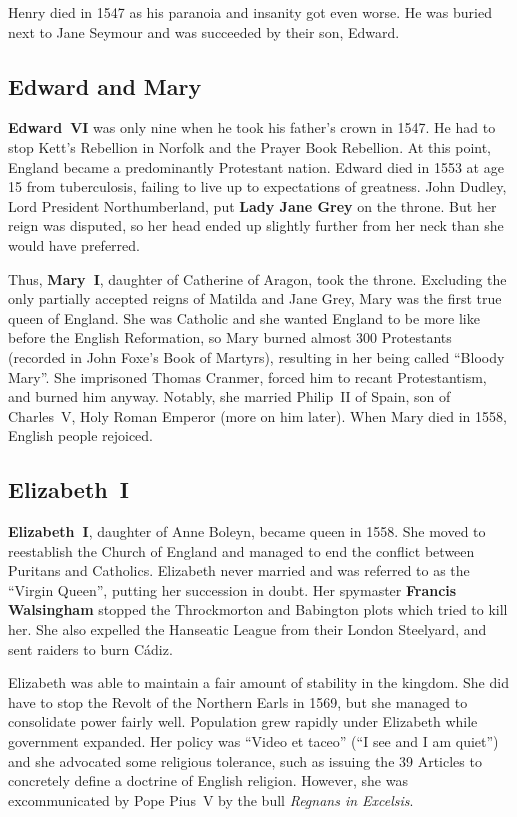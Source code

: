 Henry died in 1547 as his paranoia and insanity got even worse.
He was buried next to Jane Seymour and was succeeded by their son, Edward.

\subsection*{Edward and Mary}

\textbf{Edward~VI} was only nine when he took his father's crown in 1547.
He had to stop Kett's Rebellion in Norfolk and the Prayer Book Rebellion.
At this point, England became a predominantly Protestant nation.
Edward died in 1553 at age 15 from tuberculosis, failing to live up to expectations of greatness.
John Dudley, Lord President Northumberland, put \textbf{Lady Jane Grey} on the throne.
But her reign was disputed,
so her head ended up slightly further from her neck than she would have preferred.

Thus, \textbf{Mary~I}, daughter of Catherine of Aragon, took the throne.
Excluding the only partially accepted reigns of Matilda and Jane Grey,
Mary was the first true queen of England.
She was Catholic and she wanted England to be more like before the English Reformation,
so Mary burned almost 300 Protestants (recorded in John Foxe's Book of Martyrs),
resulting in her being called ``Bloody Mary''.
She imprisoned Thomas Cranmer, forced him to recant Protestantism, and burned him anyway.
Notably, she married Philip~II of Spain, son of Charles~V, Holy Roman Emperor (more on him later).
When Mary died in 1558, English people rejoiced.

\subsection*{Elizabeth~I}

\textbf{Elizabeth~I}, daughter of Anne Boleyn, became queen in 1558.
She moved to reestablish the Church of England
and managed to end the conflict between Puritans and Catholics.
Elizabeth never married and was referred to as the ``Virgin Queen'',
putting her succession in doubt.
Her spymaster \textbf{Francis Walsingham}
stopped the Throckmorton and Babington plots which tried to kill her.
She also expelled the Hanseatic League from their London Steelyard, and sent raiders to burn Cádiz.

Elizabeth was able to maintain a fair amount of stability in the kingdom.
She did have to stop the Revolt of the Northern Earls in 1569,
but she managed to consolidate power fairly well.
Population grew rapidly under Elizabeth while government expanded.
Her policy was ``Video et taceo'' (``I see and I am quiet'')
and she advocated some religious tolerance,
such as issuing the 39 Articles to concretely define a doctrine of English religion.
However, she was excommunicated by Pope Pius~V by the bull \textit{Regnans in Excelsis}.

